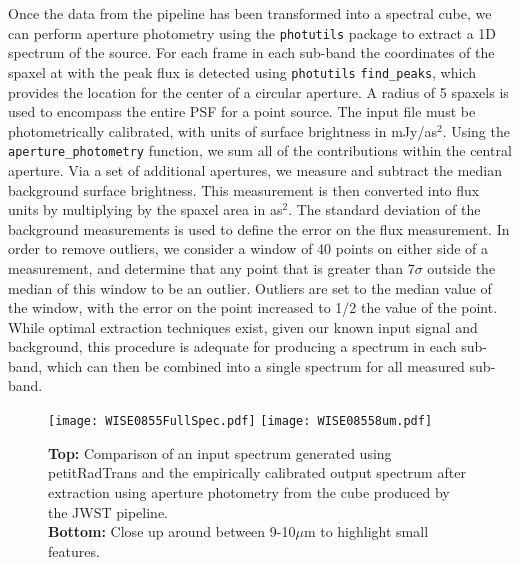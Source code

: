 Once the data from the pipeline has been transformed into a spectral cube, we can perform aperture photometry using the \verb|photutils| package to extract a 1D spectrum of the source.
For each frame in each sub-band the coordinates of the spaxel at with the peak flux is detected using \verb|photutils| \verb|find_peaks|, which provides the location for the center of a circular aperture.
A radius of 5 spaxels is used to encompass the entire PSF for a point source.
The input file must be photometrically calibrated, with units of surface brightness in mJy/as$^{2}$.
Using the \verb|aperture_photometry| function, we sum all of the contributions within the central aperture.
Via a set of additional apertures, we measure and subtract the median background surface brightness.
This measurement is then converted into flux units by multiplying by the spaxel area in as$^{2}$.
The standard deviation of the background measurements is used to define the error on the flux measurement.
In order to remove outliers, we consider a window of 40 points on either side of a measurement, and determine that any point that is greater than 7$\sigma$ outside the median of this window to be an outlier.
Outliers are set to the median value of the window, with the error on the point increased to 1/2 the value of the point.
While optimal extraction techniques exist, given our known input signal and background, this procedure is adequate for producing a spectrum in each sub-band, which can then be combined into a single spectrum for all measured sub-band.
\begin{figure}[t]
	\centering
	\texttt{[image: WISE0855FullSpec.pdf]}
	\texttt{[image: WISE08558um.pdf]}
	\caption{\textbf{Top:} Comparison of an input spectrum generated using petitRadTrans and the empirically calibrated output spectrum after extraction using aperture photometry from the cube produced by the JWST pipeline. \\
	\textbf{Bottom:} Close up around between 9-10$\mu$m to highlight small features.}
	\label{fig:cal}
\end{figure}

